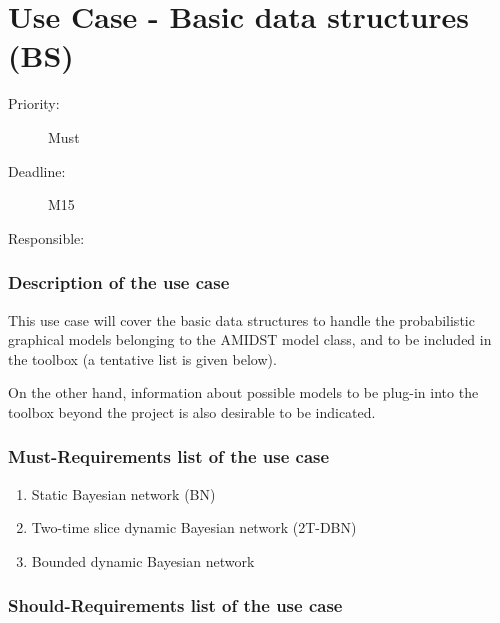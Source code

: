 \newpage
\section{Use Case - Basic data structures (BS)}
\label{UseCase:BS}

\begin{description}
\item[Priority:] Must
\item[Deadline:] M15
\item[Responsible:] 
\end{description}

\subsubsection*{Description of the use case}

This use case will cover the basic data structures to handle the probabilistic graphical models belonging to the AMIDST model class, and to be included in the toolbox (a tentative list is given below).

On the other hand, information about possible models to be plug-in into the toolbox beyond the project is also desirable to be indicated.  

\subsubsection*{Must-Requirements list of the use case}

\begin{enumerate}
\item Static Bayesian network (BN)
\item Two-time slice dynamic Bayesian network (2T-DBN)
\item Bounded dynamic Bayesian network 
\end{enumerate}

\subsubsection*{Should-Requirements list of the use case}

